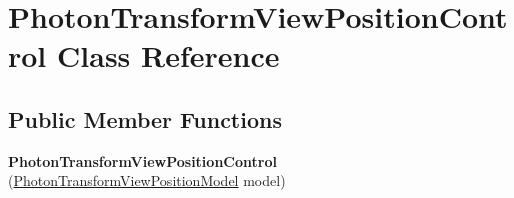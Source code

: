 \hypertarget{class_photon_transform_view_position_control}{}\section{Photon\+Transform\+View\+Position\+Control Class Reference}
\label{class_photon_transform_view_position_control}
\subsection*{Public Member Functions}
\begin{DoxyCompactItemize}
\item 
{\bfseries Photon\+Transform\+View\+Position\+Control} (\hyperlink{class_photon_transform_view_position_model}{Photon\+Transform\+View\+Position\+Model} model)\hypertarget{class_photon_transform_view_position_control_a3f4cd754b21276bef76609b608e9e774}{}\label{class_photon_transform_view_position_control_a3f4cd754b21276bef76609b608e9e774}


\end{DoxyCompactItemize}
